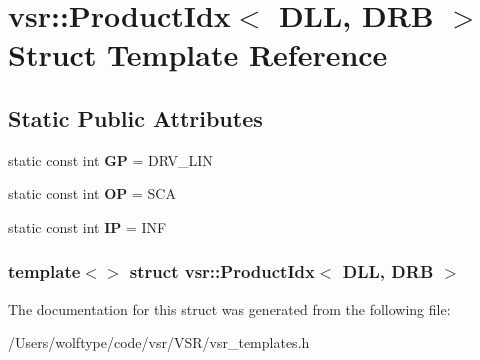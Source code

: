 \hypertarget{structvsr_1_1_product_idx_3_01_d_l_l_00_01_d_r_b_01_4}{\section{vsr\-:\-:Product\-Idx$<$ D\-L\-L, D\-R\-B $>$ Struct Template Reference}
\label{structvsr_1_1_product_idx_3_01_d_l_l_00_01_d_r_b_01_4}
}
\subsection*{Static Public Attributes}
\begin{DoxyCompactItemize}
\item 
\hypertarget{structvsr_1_1_product_idx_3_01_d_l_l_00_01_d_r_b_01_4_a262236dff8b47dd5c3483cb10f8ab68f}{static const int {\bfseries G\-P} = D\-R\-V\-\_\-\-L\-I\-N}\label{structvsr_1_1_product_idx_3_01_d_l_l_00_01_d_r_b_01_4_a262236dff8b47dd5c3483cb10f8ab68f}

\item 
\hypertarget{structvsr_1_1_product_idx_3_01_d_l_l_00_01_d_r_b_01_4_ad946ab548379d26e9939b69d34805377}{static const int {\bfseries O\-P} = S\-C\-A}\label{structvsr_1_1_product_idx_3_01_d_l_l_00_01_d_r_b_01_4_ad946ab548379d26e9939b69d34805377}

\item 
\hypertarget{structvsr_1_1_product_idx_3_01_d_l_l_00_01_d_r_b_01_4_a36608f885bea252dd3e1706f9729bf47}{static const int {\bfseries I\-P} = I\-N\-F}\label{structvsr_1_1_product_idx_3_01_d_l_l_00_01_d_r_b_01_4_a36608f885bea252dd3e1706f9729bf47}

\end{DoxyCompactItemize}
\subsubsection*{template$<$$>$ struct vsr\-::\-Product\-Idx$<$ D\-L\-L, D\-R\-B $>$}



The documentation for this struct was generated from the following file\-:\begin{DoxyCompactItemize}
\item 
/\-Users/wolftype/code/vsr/\-V\-S\-R/vsr\-\_\-templates.\-h\end{DoxyCompactItemize}
